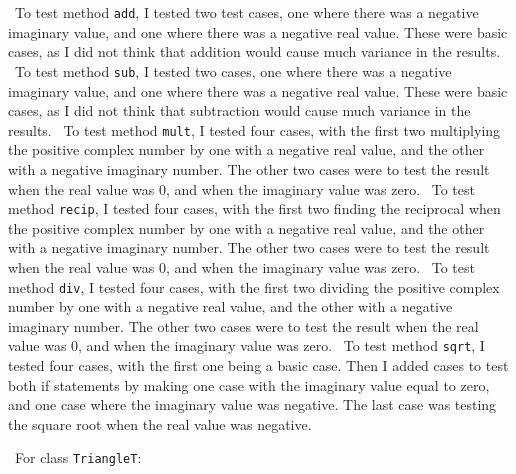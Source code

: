 \documentclass[12pt]{article}
\begin{document}
~\newline\noindent To test method \verb|add|, I tested two test cases, one where there was a negative imaginary value, and one where there was a negative real value. These were basic cases, as I did not think that addition would cause much variance in the results. 
~\newline\noindent To test method \verb|sub|, I tested two cases, one where there was a negative imaginary value, and one where there was a negative real value. These were basic cases, as I did not think that subtraction would cause much variance in the results. 
~\newline\noindent To test method \verb|mult|, I tested four cases, with the first two multiplying the positive complex number by one with a negative real value, and the other with a negative imaginary number. The other two cases were to test the result when the real value was 0, and when the imaginary value was zero. 
~\newline\noindent To test method \verb|recip|, I tested four cases, with the first two finding the reciprocal when the positive complex number by one with a negative real value, and the other with a negative imaginary number. The other two cases were to test the result when the real value was 0, and when the imaginary value was zero. 
~\newline\noindent To test method \verb|div|, I tested four cases, with the first two dividing the positive complex number by one with a negative real value, and the other with a negative imaginary number. The other two cases were to test the result when the real value was 0, and when the imaginary value was zero. 
~\newline\noindent To test method \verb|sqrt|, I tested four cases, with the first one being a basic case. Then I added cases to test both if statements by making one case with the imaginary value equal to zero, and one case where the imaginary value was negative. The last case was testing the square root when the real value was negative. 

~\newline\noindent For class \verb|TriangleT|:
\end{document}
